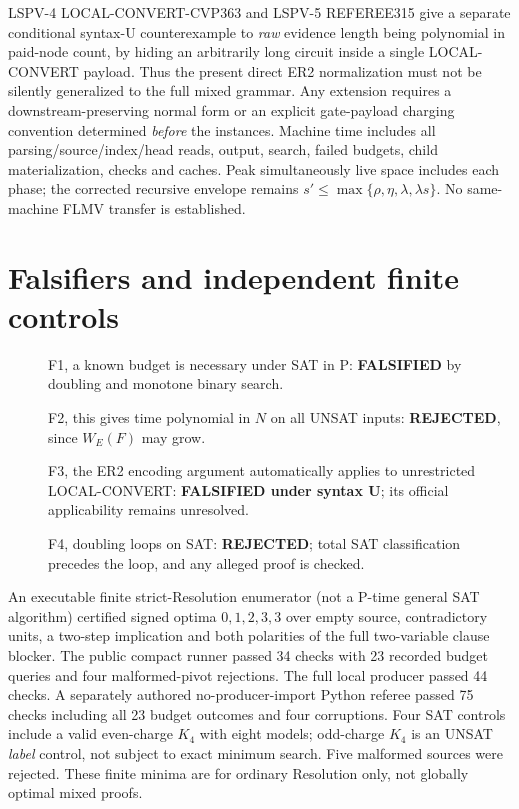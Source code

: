 \documentclass[11pt]{article}
\begin{document}
LSPV-4 LOCAL-CONVERT-CVP363 and LSPV-5 REFEREE315 give a separate conditional syntax-U counterexample to \emph{raw} evidence length being polynomial in paid-node count, by hiding an arbitrarily long circuit inside a single LOCAL-CONVERT payload. Thus the present direct ER2 normalization must not be silently generalized to the full mixed grammar. Any extension requires a downstream-preserving normal form or an explicit gate-payload charging convention determined \emph{before} the instances. Machine time includes all parsing/source/index/head reads, output, search, failed budgets, child materialization, checks and caches. Peak simultaneously live space includes each phase; the corrected recursive envelope remains $s'\le\max\{\rho,\eta,\lambda,\lambda s\}$. No same-machine FLMV transfer is established.

\section*{Falsifiers and independent finite controls}
\begin{description}
\item[] F1, a known budget is necessary under SAT in P: \textbf{FALSIFIED} by doubling and monotone binary search.
\item[] F2, this gives time polynomial in $N$ on all UNSAT inputs: \textbf{REJECTED}, since $W_E(F)$ may grow.
\item[] F3, the ER2 encoding argument automatically applies to unrestricted LOCAL-CONVERT: \textbf{FALSIFIED under syntax U}; its official applicability remains unresolved.
\item[] F4, doubling loops on SAT: \textbf{REJECTED}; total SAT classification precedes the loop, and any alleged proof is checked.
\end{description}
An executable finite strict-Resolution enumerator (not a P-time general SAT algorithm) certified signed optima $0,1,2,3,3$ over empty source, contradictory units, a two-step implication and both polarities of the full two-variable clause blocker. The public compact runner passed 34 checks with 23 recorded budget queries and four malformed-pivot rejections. The full local producer passed 44 checks. A separately authored no-producer-import Python referee passed 75 checks including all 23 budget outcomes and four corruptions. Four SAT controls include a valid even-charge $K_4$ with eight models; odd-charge $K_4$ is an UNSAT \emph{label} control, not subject to exact minimum search. Five malformed sources were rejected. These finite minima are for ordinary Resolution only, not globally optimal mixed proofs.
\end{document}
